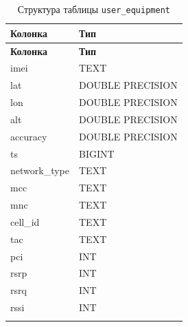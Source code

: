 \documentclass[a4paper,14pt,oneside,openany]{memoir}
\begin{document}
\begin{longtable}{|l|l|}
\hline
\textbf{Колонка}    & \textbf{Тип} \\ \hline
\endfirsthead
\hline
\textbf{Колонка}    & \textbf{Тип} \\ \hline
\endhead
imei                & TEXT \\
lat                 & DOUBLE PRECISION \\
lon                 & DOUBLE PRECISION \\
alt                 & DOUBLE PRECISION \\
accuracy            & DOUBLE PRECISION \\
ts                  & BIGINT \\
network\_type       & TEXT \\
mcc                 & TEXT \\
mnc                 & TEXT \\
cell\_id            & TEXT \\
tac                 & TEXT \\
pci                 & INT \\
rsrp                & INT \\
rsrq                & INT \\
rssi                & INT \\
\hline
\caption{Структура таблицы \texttt{user\_equipment}}
\end{longtable}
\end{document}
